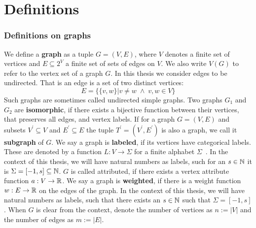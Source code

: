 \section{Definitions}

\begin{frame}[allowframebreaks=0.9]
\frametitle{Definitions on graphs}
	We define a \textbf{graph} as a tuple $G=(V, E)$, where $V$ denotes a finite set of vertices and $E\subseteq 2^V$ a finite set of sets of edges on $V$. 
	We also write $V(G)$ to refer to the vertex set of a graph $G$.
	In this thesis we consider edges to be undirected. 
	That is an edge is a set of two distinct vertices:
	\begin{equation}
		E=\big\{ \{v,w\}| v\neq w \;\land\; v,w\in V \big\}
	\end{equation}
	Such graphs are sometimes called undirected simple graphs.
	Two graphs $G_1$ and $G_2$ are \textbf{isomorphic}, if there exists a bijective function between their vertices, that preserves all edges, and vertex labels.
	If for a graph $G=(V, E)$ and subsets $V^\prime \subseteq V$ and $E^\prime \subseteq E$ the tuple $T^\prime=(V^\prime, E^\prime)$ is also a graph, we call it \textbf{subgraph} of $G$.
	We say a graph is \textbf{labeled}, if its vertices have categorical labels.
	These are denoted by a function $L:V\to\Sigma$ for a finite alphabet $\Sigma$~\cite{2019_Togninalli_NIPS}.
	In the context of this thesis, we will have natural numbers as labels, such for an $s\in \mathbb{N}$ it is $\Sigma = [-1, s]\subseteq\mathbb{N}$.
	$G$ is called attributed, if there exists a vertex attribute function $a: V \to\mathbb{R}$.
	We say a graph is \textbf{weighted}, if there is a weight function $w:E\to\mathbb{R}$ on the edges of the graph.
	In the context of this thesis, we will have natural numbers as labels, such that there exists an $s\in \mathbb{N}$ such that $\Sigma = [-1, s]$.  
	When $G$ is clear from the context, denote the number of vertices as $n:=|V|$ and the number of edges as $m:=|E|$.\\
	

\end{frame}
